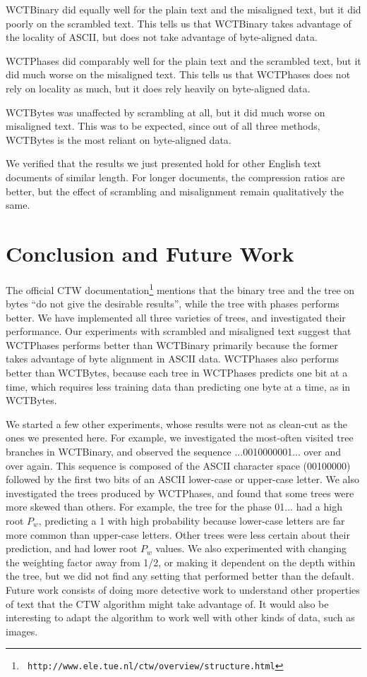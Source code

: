 \documentclass[11pt]{scrartcl}
\begin{document}
WCTBinary did equally well for the plain text and the misaligned text, but it
did poorly on the scrambled text. This tells us that WCTBinary takes advantage
of the locality of ASCII, but does not take advantage of byte-aligned data.

WCTPhases did comparably well for the plain text and the scrambled text, but it
did much worse on the misaligned text. This tells us that WCTPhases does not
rely on locality as much, but it does rely heavily on byte-aligned data.

WCTBytes was unaffected by scrambling at all, but it did much worse on
misaligned text. This was to be expected, since out of all three methods,
WCTBytes is the most reliant on byte-aligned data.

We verified that the results we just presented hold for other English text
documents of similar length. For longer documents, the compression ratios are
better, but the effect of scrambling and misalignment remain qualitatively the
same.


\section{Conclusion and Future Work}
\label{sec:conclusion}

The official CTW documentation\footnote{{\tt
http://www.ele.tue.nl/ctw/overview/structure.html}} mentions that the binary
tree and the tree on bytes ``do not give the desirable results'', while the
tree with phases performs better. We have implemented all three varieties of
trees, and investigated their performance. Our experiments with scrambled and
misaligned text suggest that WCTPhases performs better than WCTBinary primarily
because the former takes advantage of byte alignment in ASCII data. WCTPhases
also performs better than WCTBytes, because each tree in WCTPhases predicts one
bit at a time, which requires less training data than predicting one byte at a
time, as in WCTBytes.

We started a few other experiments, whose results were not as clean-cut as the
ones we presented here. For example, we investigated the most-often visited
tree branches in WCTBinary, and observed the sequence ...0010000001... over and
over again. This sequence is composed of the ASCII character space (00100000)
followed by the first two bits of an ASCII lower-case or upper-case letter. We
also investigated the trees produced by WCTPhases, and found that some trees
were more skewed than others. For example, the tree for the phase 01... had a
high root $P_w$, predicting a 1 with high probability because lower-case
letters are far more common than upper-case letters. Other trees were less
certain about their prediction, and had lower root $P_w$ values. We also
experimented with changing the weighting factor away from 1/2, or making it
dependent on the depth within the tree, but we did not find any setting that
performed better than the default. Future work consists of doing more detective
work to understand other properties of text that the CTW algorithm might take
advantage of. It would also be interesting to adapt the algorithm to work well
with other kinds of data, such as images.


\printbibliography
\end{document}
